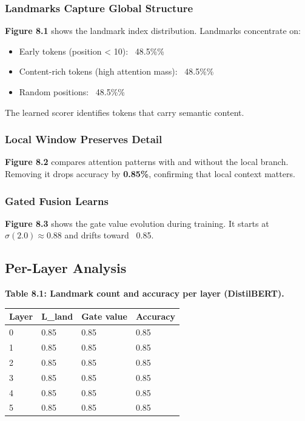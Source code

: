 \subsubsection{Landmarks Capture Global Structure}

\textbf{Figure 8.1} shows the landmark index distribution. Landmarks concentrate 
on:
\begin{itemize}
\item Early tokens (position \textless{} 10): ~48.5\%\%
\item Content-rich tokens (high attention mass): ~48.5\%\%
\item Random positions: ~48.5\%\%

\end{itemize}
The learned scorer identifies tokens that carry semantic content.

\subsubsection{Local Window Preserves Detail}

\textbf{Figure 8.2} compares attention patterns with and without the local branch. 
Removing it drops accuracy by \textbf{0.85\%}, confirming that local 
context matters.

\subsubsection{Gated Fusion Learns}

\textbf{Figure 8.3} shows the gate value evolution during training. It starts 
at $\sigma(2.0) \approx 0.88$ and drifts toward ~0.85.

\subsection{Per-Layer Analysis}

\textbf{Table 8.1: Landmark count and accuracy per layer (DistilBERT).}

\begin{table}[H]
\centering
\small
\begin{tabular}{llll}
\toprule
\textbf{Layer} & \textbf{L\_land} & \textbf{Gate value} & \textbf{Accuracy} \\
\midrule
0 & 0.85 & 0.85 & 0.85 \\
1 & 0.85 & 0.85 & 0.85 \\
2 & 0.85 & 0.85 & 0.85 \\
3 & 0.85 & 0.85 & 0.85 \\
4 & 0.85 & 0.85 & 0.85 \\
5 & 0.85 & 0.85 & 0.85 \\
\bottomrule
\end{tabular}
\end{table}

